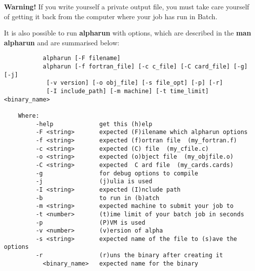 {\bf Warning!} If you write yourself a private output file, you must take care yourself of getting it back from the  
computer where your job has run in Batch.
\par
It is also possible to run {\bf alpharun} with options, which are described in the {\bf man alpharun} and are summarised below:
\par
\begin{verbatim}
           alpharun [-F filename]
           alpharun [-f fortran_file] [-c c_file] [-C card_file] [-g] [-j]
            [-v version] [-o obj_file] [-s file_opt] [-p] [-r]
            [-I include_path] [-m machine] [-t time_limit] <binary_name>
 
    Where:
         -help             get this (h)elp
         -F <string>       expected (F)ilename which alpharun options
         -f <string>       expected (f)ortran file  (my_fortran.f)
         -c <string>       expected (C) file  (my_cfile.c)
         -o <string>       expected (o)bject file  (my_objfile.o)
         -C <string>       expected  C ard file  (my_cards.cards)
         -g                for debug options to compile
         -j                (j)ulia is used
         -I <string>       expected (I)nclude path
         -b                to run in (b)atch
         -m <string>       expected machine to submit your job to
         -t <number>       (t)ime limit of your batch job in seconds
         -p                (P)VM is used
         -v <number>       (v)ersion of alpha
         -s <string>       expected name of the file to (s)ave the options
         -r                (r)uns the binary after creating it
           <binary_name>   expected name for the binary
\end{verbatim}
 
